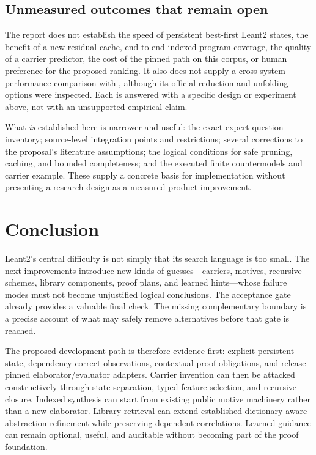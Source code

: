 \documentclass[11pt,a4paper]{article}
\newcommand{\code}[1]{\texttt{\detokenize{#1}}}
\theoremstyle{definition}
\theoremstyle{remark}
\begin{document}
\subsection{Unmeasured outcomes that remain open}

The report does not establish the speed of persistent best-first Leant2 states, the benefit of a new residual cache, end-to-end indexed-program coverage, the quality of a carrier predictor, the cost of the pinned \code{cbv} path on this corpus, or human preference for the proposed ranking. It also does not supply a cross-system performance comparison with \code{sauto}, although its official reduction and unfolding options were inspected. Each is answered with a specific design or experiment above, not with an unsupported empirical claim.

What \emph{is} established here is narrower and useful: the exact expert-question inventory; source-level integration points and restrictions; several corrections to the proposal's literature assumptions; the logical conditions for safe pruning, caching, and bounded completeness; and the executed finite countermodels and carrier example. These supply a concrete basis for implementation without presenting a research design as a measured product improvement.

\section{Conclusion}

Leant2's central difficulty is not simply that its search language is too small. The next improvements introduce new kinds of guesses---carriers, motives, recursive schemes, library components, proof plans, and learned hints---whose failure modes must not become unjustified logical conclusions. The acceptance gate already provides a valuable final check. The missing complementary boundary is a precise account of what may safely remove alternatives before that gate is reached.

The proposed development path is therefore evidence-first: explicit persistent state, dependency-correct observations, contextual proof obligations, and release-pinned elaborator/evaluator adapters. Carrier invention can then be attacked constructively through state separation, typed feature selection, and recursive closure. Indexed synthesis can start from existing public motive machinery rather than a new elaborator. Library retrieval can extend established dictionary-aware abstraction refinement while preserving dependent correlations. Learned guidance can remain optional, useful, and auditable without becoming part of the proof foundation.
\end{document}
